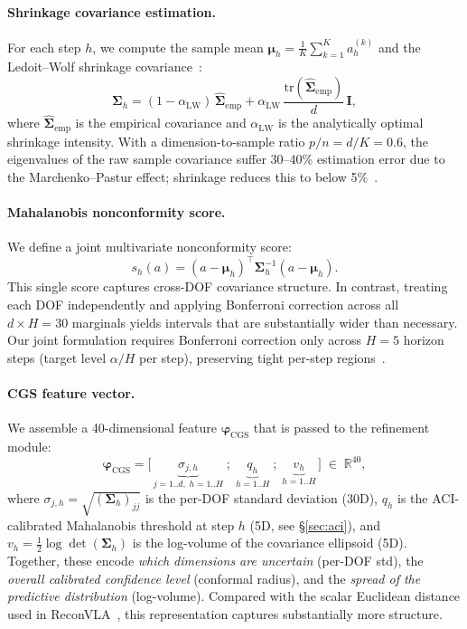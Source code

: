 \paragraph{Shrinkage covariance estimation.}
For each step $h$, we compute the sample mean $\boldsymbol{\mu}_h = \frac{1}{K}\sum_{k=1}^K a_h^{(k)}$ and the Ledoit--Wolf shrinkage covariance~\cite{ledoit2004well}:
\begin{equation}
  \boldsymbol{\Sigma}_h = (1-\alpha_{\mathrm{LW}})\,\hat{\boldsymbol{\Sigma}}_{\mathrm{emp}} + \alpha_{\mathrm{LW}}\,\frac{\mathrm{tr}(\hat{\boldsymbol{\Sigma}}_{\mathrm{emp}})}{d}\,\mathbf{I},
  \label{eq:shrinkage}
\end{equation}
where $\hat{\boldsymbol{\Sigma}}_{\mathrm{emp}}$ is the empirical covariance and $\alpha_{\mathrm{LW}}$ is the analytically optimal shrinkage intensity.  With a dimension-to-sample ratio $p/n = d/K = 0.6$, the eigenvalues of the raw sample covariance suffer 30--40\% estimation error due to the Marchenko--Pastur effect; shrinkage reduces this to below 5\%~\cite{ledoit2004well}.

\paragraph{Mahalanobis nonconformity score.}
We define a joint multivariate nonconformity score:
\begin{equation}
  s_h(a) = (a - \boldsymbol{\mu}_h)^\top \boldsymbol{\Sigma}_h^{-1} (a - \boldsymbol{\mu}_h).
  \label{eq:mahal}
\end{equation}
This single score captures cross-DOF covariance structure.  In contrast, treating each DOF independently and applying Bonferroni correction across all $d{\times}H = 30$ marginals yields intervals that are substantially wider than necessary.  Our joint formulation requires Bonferroni correction only across $H{=}5$ horizon steps (target level $\alpha/H$ per step), preserving tight per-step regions~\cite{braun2025cgs}.

\paragraph{CGS feature vector.}
We assemble a 40-dimensional feature $\boldsymbol{\varphi}_{\mathrm{CGS}}$ that is passed to the refinement module:
\begin{equation}
  \boldsymbol{\varphi}_{\mathrm{CGS}} = \bigl[\,\underbrace{\sigma_{j,h}}_{j=1..d,\;h=1..H}\;;\;\underbrace{q_h}_{h=1..H}\;;\;\underbrace{v_h}_{h=1..H}\,\bigr] \;\in\;\mathbb{R}^{40},
  \label{eq:cgs_feat}
\end{equation}
where $\sigma_{j,h} = \sqrt{(\boldsymbol{\Sigma}_h)_{jj}}$ is the per-DOF standard deviation (30D), $q_h$ is the ACI-calibrated Mahalanobis threshold at step $h$ (5D, see \S\ref{sec:aci}), and $v_h = \tfrac{1}{2}\log\det(\boldsymbol{\Sigma}_h)$ is the log-volume of the covariance ellipsoid (5D).  Together, these encode \emph{which dimensions are uncertain} (per-DOF std), the \emph{overall calibrated confidence level} (conformal radius), and the \emph{spread of the predictive distribution} (log-volume).  Compared with the scalar Euclidean distance used in ReconVLA~\cite{chen2026reconvla}, this representation captures substantially more structure.

